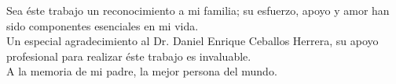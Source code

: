 
\begin{acknowledgements}


  Sea éste trabajo un reconocimiento a mi familia; su esfuerzo, apoyo y amor 
  han sido componentes esenciales en mi vida.\\
  

  \noindent Un especial agradecimiento al Dr. Daniel Enrique Ceballos Herrera, su apoyo profesional
  para realizar éste trabajo es invaluable.\\

  \noindent A la memoria de mi padre, la mejor persona del mundo.

  \end{acknowledgements}




